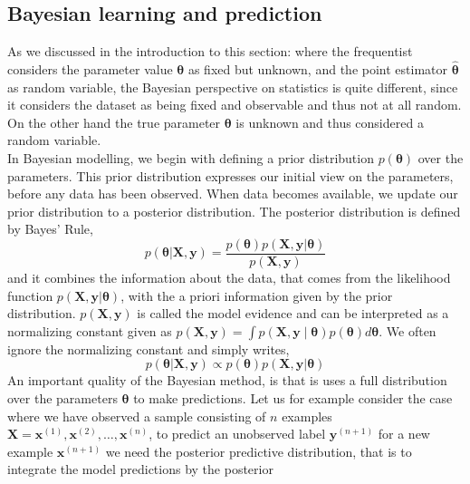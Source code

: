 \subsection{Bayesian learning and prediction}
As we discussed in the introduction to this section: where the frequentist considers the parameter value $\boldsymbol{\theta}$ as fixed but unknown, and the point estimator $\hat{\boldsymbol{\theta}}$ as random variable, the Bayesian perspective on statistics is quite different, since it considers the dataset as being fixed and observable and thus not at all random. On the other hand the true parameter $\boldsymbol{\theta}$ is unknown and thus considered a random variable. \\
In Bayesian modelling, we begin with defining a prior distribution $p(\boldsymbol{\theta})$ over the parameters. This prior distribution expresses our initial view on the parameters, before any data has been observed. When data becomes available, we update our prior distribution to a posterior distribution. The posterior distribution is defined by Bayes' Rule, 
\begin{equation*}
         p(\boldsymbol{\theta}|\mathbf{X},\mathbf{y})=\frac{p(\boldsymbol{\theta})p(\mathbf{X},\mathbf{y}|\boldsymbol{\theta})}{p(\mathbf{X},\mathbf{y})}
\end{equation*}
and it combines the information about the data, that comes from the likelihood function $p(\mathbf{X},\mathbf{y}|\boldsymbol{\theta})$, with the a priori information given by the prior distribution. $p(\mathbf{X},\mathbf{y})$ is called the model evidence and can be interpreted as a normalizing constant given as $p(\mathbf{X},\mathbf{y})=\int p(\mathbf{X},\mathbf{y}\mid \boldsymbol{\theta})p(\boldsymbol{\theta})d\boldsymbol{\theta}$.
We often ignore the normalizing constant and simply writes, 
\begin{equation} \label{eq:posterior}
    p(\boldsymbol{\theta}|\mathbf{X},\mathbf{y})\propto p(\boldsymbol{\theta})p(\mathbf{X},\mathbf{y}|\boldsymbol{\theta})
\end{equation}
An important quality of the Bayesian method, is that is uses a full distribution over the parameters $\boldsymbol{\theta}$ to make predictions. Let us for example consider the case where we have observed a sample consisting of $n$ examples $\mathbf{X}=\boldsymbol{x}^{(1)}, \boldsymbol{x}^{(2)},\ldots, \boldsymbol{x}^{(n)}$, to predict an unobserved label $\boldsymbol{y}^{(n+1)}$ for a new example $\boldsymbol{x}^{(n+1)}$ we need the 
posterior predictive distribution, that is to integrate the model predictions by the posterior

